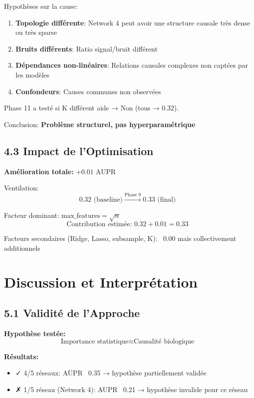 \documentclass[12pt,a4paper,french]{article}
\begin{document}
Hypothèses sur la cause:
\begin{enumerate}
    \item \textbf{Topologie différente}: Network 4 peut avoir une structure causale très dense ou très sparse
    \item \textbf{Bruits différents}: Ratio signal/bruit différent
    \item \textbf{Dépendances non-linéaires}: Relations causales complexes non captées par les modèles
    \item \textbf{Confondeurs}: Causes communes non observées
\end{enumerate}

Phase 11 a testé si K différent aide → Non (tous → 0.32).

Conclusion: \textbf{Problème structurel, pas hyperparamétrique}

\subsection{4.3 Impact de l'Optimisation}

\textbf{Amélioration totale:} $\boxed{+0.01 \text{ AUPR}}$

Ventilation:
\begin{equation}
0.32 \text{ (baseline)} \xrightarrow{\text{Phase 9}} 0.33 \text{ (final)}
\end{equation}

Facteur dominant: $\text{max\_features} = \sqrt{n}$
\begin{equation}
\text{Contribution estimée: } 0.32 + 0.01 = 0.33
\end{equation}

Facteurs secondaires (Ridge, Lasso, subsample, K): ~0.00 mais collectivement additionnels

\section{Discussion et Interprétation}

\subsection{5.1 Validité de l'Approche}

\textbf{Hypothèse testée:}
\begin{equation}
\text{Importance statistique} \approx \text{Causalité biologique}
\end{equation}

\textbf{Résultats:}
\begin{itemize}
    \item ✓ 4/5 réseaux: AUPR ~0.35 → hypothèse partiellement validée
    \item ✗ 1/5 réseau (Network 4): AUPR ~0.21 → hypothèse invalide pour ce réseau
\end{itemize}
\end{document}

